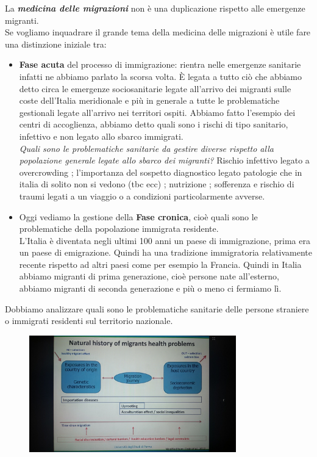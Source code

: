 La \textbf{\emph{medicina delle migrazioni}} non è una duplicazione
rispetto alle emergenze migranti.\\
Se vogliamo inquadrare il grande tema della medicina delle migrazioni è
utile fare una distinzione iniziale tra:\\
\begin{itemize}
\item \textbf{Fase acuta} del processo di immigrazione: rientra nelle
emergenze sanitarie infatti ne abbiamo parlato la scorsa volta. È legata
a tutto ciò che abbiamo detto circa le emergenze sociosanitarie legate
all'arrivo dei migranti sulle coste dell'Italia meridionale e più in
generale a tutte le problematiche gestionali legate all'arrivo nei
territori ospiti. Abbiamo fatto l'esempio dei centri di accoglienza,
abbiamo detto quali sono i rischi di tipo sanitario, infettivo e non
legato allo sbarco immigrati.\\
\emph{Quali sono le problematiche sanitarie da gestire diverse rispetto
alla popolazione generale legate allo sbarco dei migranti?} Rischio
infettivo legato a overcrowding ; l'importanza del sospetto diagnostico
legato patologie che in italia di solito non si vedono (tbc ecc) ;
nutrizione ; sofferenza e rischio di traumi legati a un viaggio o a
condizioni particolarmente avverse.
\item Oggi vediamo la gestione della \textbf{Fase cronica}, cioè quali sono
le problematiche della popolazione immigrata residente.\\
L'Italia è diventata negli ultimi 100 anni un paese di immigrazione,
prima era un paese di emigrazione. Quindi ha una tradizione immigratoria
relativamente recente rispetto ad altri paesi come per esempio la
Francia. Quindi in Italia abbiamo migranti di prima generazione, cioè
persone nate all'esterno, abbiamo migranti di seconda generazione e più
o meno ci fermiamo lì.
\end{itemize}
Dobbiamo analizzare quali sono le problematiche sanitarie delle persone
straniere o immigrati residenti sul territorio nazionale.

\begin{figure}[!ht]
\centering
	\includegraphics[width=0.8\textwidth]{27/image1.jpeg}
	\end{figure}

